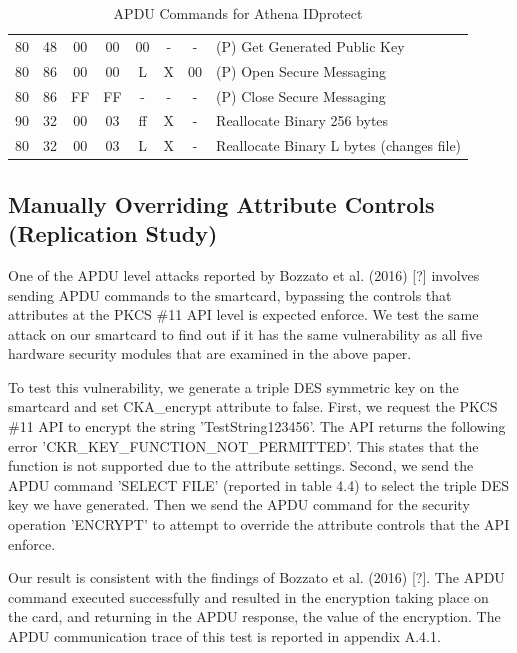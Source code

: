 \documentclass[bsc,frontabs,twoside,singlespacing,parskip,deptreport]{infthesis}     %
\begin{document}
\begin{table}[H]
\begin{tabular}{|c|c|c|c|c|c|c|p{8cm}|}
80  & 48  & 00 & 00 & 00  & -          & -  & (P) Get Generated Public Key\\
80  & 86  & 00 & 00 & L   & X          & 00 & (P) Open Secure Messaging\\
80  & 86  & FF & FF & -   & -          & -  & (P) Close Secure Messaging\\
\hline
90  & 32  & 00 & 03 & ff  & X          & -  &  Reallocate Binary 256 bytes\\
80  & 32  & 00 & 03 & L   & X          & -  &  Reallocate Binary L bytes (changes file)\\
\hline
\end{tabular}
\caption{APDU Commands for Athena IDprotect}
\end{table} 


\subsection{Manually Overriding Attribute Controls (Replication Study)}
One of the APDU level attacks reported by Bozzato et al. (2016) [?] involves sending APDU commands to the smartcard, bypassing the controls that attributes at the PKCS \#11 API level is expected enforce. We test the same attack on our smartcard to find out if it has the same vulnerability as all five hardware security modules that are examined in the above paper. 

To test this vulnerability, we generate a triple DES symmetric key on the smartcard and set CKA\_encrypt attribute to false. First, we request the PKCS \#11 API to encrypt the string 'TestString123456'. The API returns the following error 'CKR\_KEY\_FUNCTION\_NOT\_PERMITTED'. This states that the function is not supported due to the attribute settings. Second, we send the APDU command 'SELECT FILE' (reported in table 4.4) to select the triple DES key we have generated. Then we send the APDU command for the security operation 'ENCRYPT' to attempt to override the attribute controls that the API enforce. 

Our result is consistent with the findings of Bozzato et al. (2016) [?]. The APDU command executed successfully and resulted in the encryption taking place on the card, and returning in the APDU response, the value of the encryption. The APDU communication trace of this test is reported in appendix A.4.1.

\end{document}
